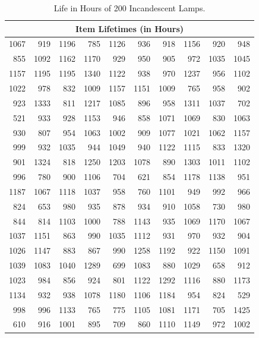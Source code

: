\begin{table}[htbp]
\centering
\small %
\renewcommand{\arraystretch}{1.2}
{
\begin{tabular}{rrrrrrrrrr}
\toprule
\multicolumn{10}{c}{\textbf{Item Lifetimes (in Hours)}} \\
\midrule
1067 & 919 & 1196 & 785 & 1126 & 936 & 918 & 1156 & 920 & 948 \\
855 & 1092 & 1162 & 1170 & 929 & 950 & 905 & 972 & 1035 & 1045 \\
1157 & 1195 & 1195 & 1340 & 1122 & 938 & 970 & 1237 & 956 & 1102 \\
1022 & 978 & 832 & 1009 & 1157 & 1151 & 1009 & 765 & 958 & 902 \\
923 & 1333 & 811 & 1217 & 1085 & 896 & 958 & 1311 & 1037 & 702 \\
521 & 933 & 928 & 1153 & 946 & 858 & 1071 & 1069 & 830 & 1063 \\
930 & 807 & 954 & 1063 & 1002 & 909 & 1077 & 1021 & 1062 & 1157 \\
999 & 932 & 1035 & 944 & 1049 & 940 & 1122 & 1115 & 833 & 1320 \\
901 & 1324 & 818 & 1250 & 1203 & 1078 & 890 & 1303 & 1011 & 1102 \\
996 & 780 & 900 & 1106 & 704 & 621 & 854 & 1178 & 1138 & 951 \\
1187 & 1067 & 1118 & 1037 & 958 & 760 & 1101 & 949 & 992 & 966 \\
824 & 653 & 980 & 935 & 878 & 934 & 910 & 1058 & 730 & 980 \\
844 & 814 & 1103 & 1000 & 788 & 1143 & 935 & 1069 & 1170 & 1067 \\
1037 & 1151 & 863 & 990 & 1035 & 1112 & 931 & 970 & 932 & 904 \\
1026 & 1147 & 883 & 867 & 990 & 1258 & 1192 & 922 & 1150 & 1091 \\
1039 & 1083 & 1040 & 1289 & 699 & 1083 & 880 & 1029 & 658 & 912 \\
1023 & 984 & 856 & 924 & 801 & 1122 & 1292 & 1116 & 880 & 1173 \\
1134 & 932 & 938 & 1078 & 1180 & 1106 & 1184 & 954 & 824 & 529 \\
998 & 996 & 1133 & 765 & 775 & 1105 & 1081 & 1171 & 705 & 1425 \\
610 & 916 & 1001 & 895 & 709 & 860 & 1110 & 1149 & 972 & 1002 \\
\bottomrule
\end{tabular}
}
\caption{Life in Hours of 200 Incandescent Lamps.}
\label{tab:lamp_life_raw}
\end{table}

